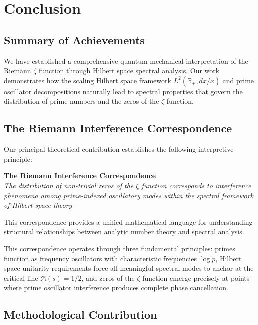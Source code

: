 \documentclass[12pt]{article}
\theoremstyle{plain}
\theoremstyle{definition}
\begin{document}
\section{Conclusion}

\subsection{Summary of Achievements}

We have established a comprehensive quantum mechanical interpretation of the Riemann $\zeta$ function through Hilbert space spectral analysis. Our work demonstrates how the scaling Hilbert space framework $L^2(\mathbb{R}_+, dx/x)$ and prime oscillator decompositions naturally lead to spectral properties that govern the distribution of prime numbers and the zeros of the $\zeta$ function.

\subsection{The Riemann Interference Correspondence}

Our principal theoretical contribution establishes the following interpretive principle:

\begin{center}
\textbf{The Riemann Interference Correspondence}\\
\textit{The distribution of non-trivial zeros of the $\zeta$ function corresponds to interference phenomena among prime-indexed oscillatory modes within the spectral framework of Hilbert space theory}
\end{center}

This correspondence provides a unified mathematical language for understanding structural relationships between analytic number theory and spectral analysis.

This correspondence operates through three fundamental principles: primes function as frequency oscillators with characteristic frequencies $\log p$, Hilbert space unitarity requirements force all meaningful spectral modes to anchor at the critical line $\Re(s) = 1/2$, and zeros of the $\zeta$ function emerge precisely at points where prime oscillator interference produces complete phase cancellation.

\subsection{Methodological Contribution}
\end{document}
